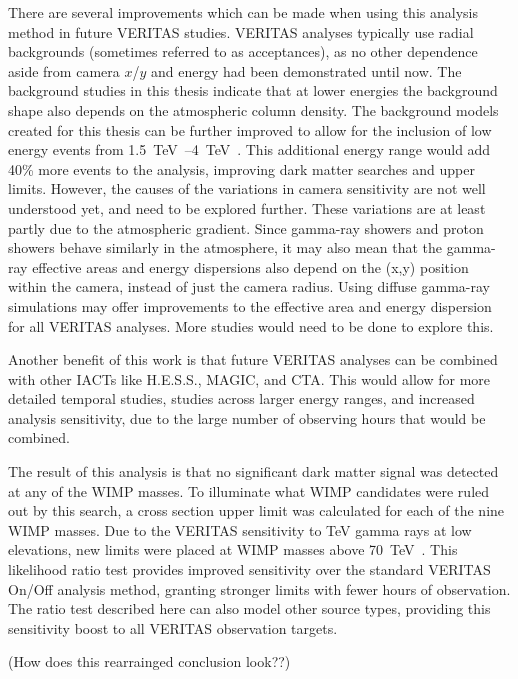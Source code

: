 There are several improvements which can be made when using this analysis method in future VERITAS studies.
VERITAS analyses typically use radial backgrounds (sometimes referred to as acceptances), as no other dependence aside from camera $x$/$y$ and energy had been demonstrated until now.
The background studies in this thesis indicate that at lower energies the background shape also depends on the atmospheric column density.
The background models created for this thesis can be further improved to allow for the inclusion of low energy events from \SIrange{1.5}{4}{\TeV{}}.
This additional energy range would add \nicetilde{}40\% more events to the analysis, improving dark matter searches and upper limits.
However, the causes of the variations in camera sensitivity are not well understood yet, and need to be explored further.
These variations are at least partly due to the atmospheric gradient.
Since gamma-ray showers and proton showers behave similarly in the atmosphere, it may also mean that the gamma-ray effective areas and energy dispersions also depend on the (x,y) position within the camera, instead of just the camera radius.
Using diffuse gamma-ray simulations may offer improvements to the effective area and energy dispersion for all VERITAS analyses.
More studies would need to be done to explore this.

Another benefit of this work is that future VERITAS analyses can be combined with other IACTs like H.E.S.S., MAGIC, and CTA.
This would allow for more detailed temporal studies, studies across larger energy ranges, and increased analysis sensitivity, due to the large number of observing hours that would be combined.

The result of this analysis is that no significant dark matter signal was detected at any of the WIMP masses.
To illuminate what WIMP candidates were ruled out by this search, a cross section upper limit was calculated for each of the nine WIMP masses.
Due to the VERITAS sensitivity to TeV gamma rays at low elevations, new limits were placed at WIMP masses above \SI{70}{\TeV{}}.
This likelihood ratio test provides improved sensitivity over the standard VERITAS On/Off analysis method, granting stronger limits with fewer hours of observation.
The ratio test described here can also model other source types, providing this sensitivity boost to all VERITAS observation targets.

{\color{red}(How does this rearrainged conclusion look??)}
